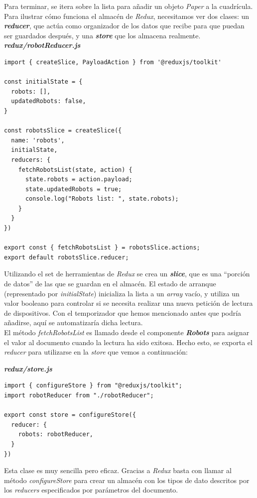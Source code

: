 Para terminar, se itera sobre la lista para añadir un objeto \textit{Paper} a la cuadrícula.\\

Para ilustrar cómo funciona el almacén de \textit{Redux}, necesitamos ver dos clases: un \textbf{\textit{reducer}}, que actúa como organizador de los datos que recibe para que puedan ser guardados después, y una \textbf{\textit{store}} que los almacena realmente.\\

\textbf{\textit{redux/robotReducer.js}}
\begin{lstlisting}
import { createSlice, PayloadAction } from '@reduxjs/toolkit'

const initialState = {
  robots: [],
  updatedRobots: false,
}

const robotsSlice = createSlice({
  name: 'robots',
  initialState,
  reducers: {
    fetchRobotsList(state, action) {
      state.robots = action.payload;
      state.updatedRobots = true;
      console.log("Robots list: ", state.robots);
    }
  }
})

export const { fetchRobotsList } = robotsSlice.actions;
export default robotsSlice.reducer;
\end{lstlisting}

Utilizando el set de herramientas de \textit{Redux} se crea un \textbf{\textit{slice}}, que es una ``porción de datos'' de las que se guardan en el almacén. El estado de arranque (representado por \emph{initialState}) inicializa la lista a un \textit{array} vacío, y utiliza un valor booleano para controlar si se necesita realizar una nueva petición de lectura de dispositivos. Con el temporizador que hemos mencionado antes que podría añadirse, aquí se automatizaría dicha lectura.\\

El método \emph{fetchRobotsList} es llamado desde el componente \textbf{\textit{Robots}} para asignar el valor al documento cuando la lectura ha sido exitosa. Hecho esto, se exporta el \textit{reducer} para utilizarse en la \textit{store} que vemos a continuación:

\textbf{\textit{redux/store.js}}
\begin{lstlisting}
import { configureStore } from "@reduxjs/toolkit";
import robotReducer from "./robotReducer";

export const store = configureStore({
  reducer: {
    robots: robotReducer,
  }
})
\end{lstlisting}

Esta clase es muy sencilla pero eficaz. Gracias a \textit{Redux} basta con llamar al método \emph{configureStore} para crear un almacén con los tipos de dato descritos por los \textit{reducers} especificados por parámetros del documento.\\

